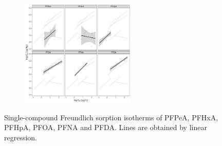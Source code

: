 \begin{figure}[t]\ContinuedFloat
        \begin{subfigure}[]{\linewidth}
            \centering
            \includegraphics[width=0.6\textwidth]{R/figs/CWC_facet_isotherm.pdf}
            \label{fig:CWC_isotherm}
        \end{subfigure}
        \caption{Single-compound Freundlich sorption isotherms of PFPeA, PFHxA, PFHpA, PFOA, PFNA and PFDA. Lines are obtained by linear regression.}
        \label{fig:sorption_isotherms_all}
\end{figure}

